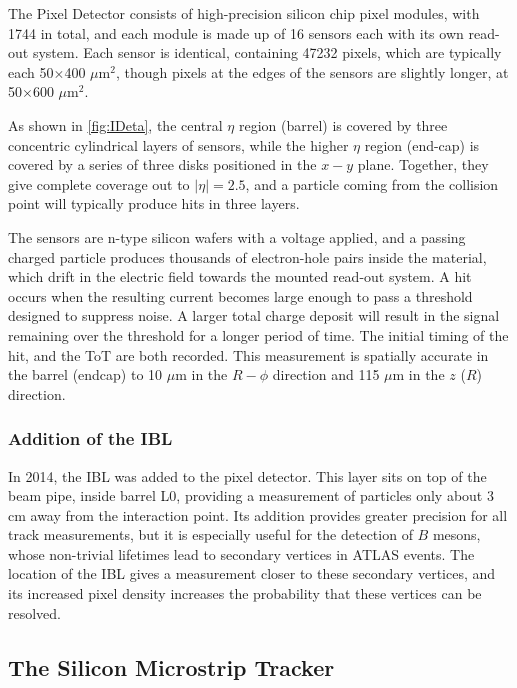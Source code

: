 The Pixel Detector consists of high-precision silicon chip pixel modules, with 1744 in total, and each module is made up of 16 sensors each with its own read-out system. Each sensor is identical, containing 47232 pixels, which are typically each 50$\times$400 $\mu$m$^2$, though pixels at the edges of the sensors are slightly longer, at 50$\times$600 $\mu$m$^2$.  

As shown in \autoref{fig:IDeta}, the central $\eta$ region (barrel) is covered by three concentric cylindrical layers of sensors, while the higher $\eta$ region (end-cap) is covered by a series of three disks positioned in the $x-y$ plane. Together, they give complete coverage out to $|\eta| = 2.5$, and a particle coming from the collision point will typically produce hits in three layers. 

The sensors are n-type silicon wafers with a voltage applied, and a passing charged particle produces thousands of electron-hole pairs inside the material, which drift in the electric field towards the mounted read-out system. A hit occurs when the resulting current becomes large enough to pass a threshold designed to suppress noise. A larger total charge deposit will result in the signal remaining over the threshold for a longer period of time. The initial timing of the hit, and the \acf{ToT} are both recorded. This measurement is spatially accurate in the barrel (endcap) to 10 $\mu$m in the $R-\phi$ direction and 115 $\mu$m in the $z$ ($R$) direction.  

\subsubsection{Addition of the IBL}

In 2014, the \ac{IBL} was added to the pixel detector. This layer sits on top of the beam pipe, inside barrel L0, providing a measurement of particles only about 3 cm away from the interaction point. Its addition provides greater precision for all track measurements, but it is especially useful for the detection of $B$ mesons, whose non-trivial lifetimes lead to secondary vertices in ATLAS events. The location of the \ac{IBL} gives a measurement closer to these secondary vertices, and its increased pixel density increases the probability that these vertices can be resolved. 

\subsection{The Silicon Microstrip Tracker}

